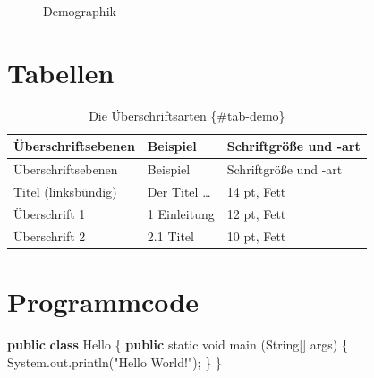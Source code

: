 \documentclass[
        english,biblatex
    ]{lni}
\newenvironment{Shaded}{\begin{snugshade}}{\end{snugshade}}
\newcommand{\BuiltInTok}[1]{\textcolor[rgb]{0.00,0.23,0.31}{#1}}
\newcommand{\DataTypeTok}[1]{\textcolor[rgb]{0.68,0.00,0.00}{#1}}
\newcommand{\FunctionTok}[1]{\textcolor[rgb]{0.28,0.35,0.67}{#1}}
\newcommand{\KeywordTok}[1]{\textcolor[rgb]{0.00,0.23,0.31}{\textbf{#1}}}
\newcommand{\NormalTok}[1]{\textcolor[rgb]{0.00,0.23,0.31}{#1}}
\newcommand{\OperatorTok}[1]{\textcolor[rgb]{0.37,0.37,0.37}{#1}}
\newcommand{\StringTok}[1]{\textcolor[rgb]{0.13,0.47,0.30}{#1}}
\begin{document}
    \begin{figure}


    \caption{\label{fig-demo}Demographik}

    \end{figure}%

    \section{Tabellen}\label{tabellen}

    \begin{longtable}[]{@{}lll@{}}
    \caption{Die Überschriftsarten \{\#tab-demo\}}\tabularnewline
    \toprule\noalign{}
    Überschriftsebenen & Beispiel & Schriftgröße und -art \\
    \midrule\noalign{}
    \endfirsthead
    \toprule\noalign{}
    Überschriftsebenen & Beispiel & Schriftgröße und -art \\
    \midrule\noalign{}
    \endhead
    \bottomrule\noalign{}
    \endlastfoot
    Titel (linksbündig) & Der Titel \ldots{} & 14 pt, Fett \\
    Überschrift 1 & 1 Einleitung & 12 pt, Fett \\
    Überschrift 2 & 2.1 Titel & 10 pt, Fett \\
    \end{longtable}

    \section{Programmcode}\label{programmcode}

\begin{Shaded}
\begin{Highlighting}[]
\KeywordTok{public} \KeywordTok{class}\NormalTok{ Hello }\OperatorTok{\{}
    \KeywordTok{public} \DataTypeTok{static} \DataTypeTok{void} \FunctionTok{main} \OperatorTok{(}\BuiltInTok{String}\OperatorTok{[]}\NormalTok{ args}\OperatorTok{)} \OperatorTok{\{}
        \BuiltInTok{System}\OperatorTok{.}\FunctionTok{out}\OperatorTok{.}\FunctionTok{println}\OperatorTok{(}\StringTok{"Hello World!"}\OperatorTok{);}
    \OperatorTok{\}}
\OperatorTok{\}}
\end{Highlighting}
\end{Shaded}
\end{document}

